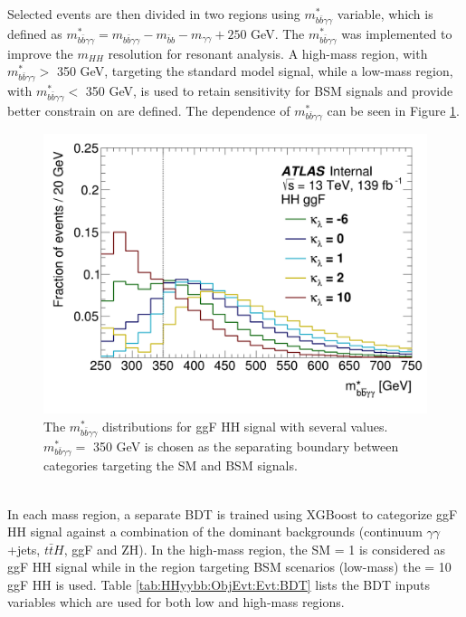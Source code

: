 Selected events are then divided in two regions using $m_{b\bar{b}\gamma\gamma}^*$ variable, which is defined as  $m_{b\bar{b}\gamma\gamma}^* = m_{b\bar{b}\gamma\gamma} - m_{\bar{b}b} - m_{\gamma\gamma} + 250$ GeV. The $m_{b\bar{b}\gamma\gamma}^*$ was implemented to improve the $m_{HH}$ resolution for resonant analysis. A high-mass region, with $m_{b\bar{b}\gamma\gamma}^* > $ 350 GeV, targeting the standard model signal, while a low-mass region, with $m_{b\bar{b}\gamma\gamma}^* < $ 350 GeV, is used to retain sensitivity for BSM signals and provide better constrain on \kl are defined. The dependence of $m_{b\bar{b}\gamma\gamma}^*$ can be seen in Figure \ref{fig:HHyybb:ObjEvt:Evt:myybb}.  
\begin{figure}[htbp]
    \centering
	\includegraphics[width=.6\textwidth]{Ch5/Img/yybbstar_ggF.png} 
    \caption{The $m_{b\bar{b}\gamma\gamma}^*$ distributions for ggF HH signal with several \kl values. $m_{b\bar{b}\gamma\gamma}^* = $ 350 GeV is chosen as the separating boundary between categories targeting the SM and BSM \kl signals.}
    \label{fig:HHyybb:ObjEvt:Evt:myybb}
\end{figure}
\\
In each mass region, a separate BDT is trained using XGBoost \cite{XGBoost} to categorize ggF HH signal against a combination of the dominant backgrounds (continuum $\gamma\gamma$+jets, $t\bar{t}H$, ggF and ZH). In the high-mass region, the SM \kl= 1 is considered as ggF HH signal while in the region targeting BSM scenarios (low-mass) the \kl= 10 ggF HH is used. Table \ref{tab:HHyybb:ObjEvt:Evt:BDT} lists the BDT inputs variables which are used for both low and high-mass regions.
